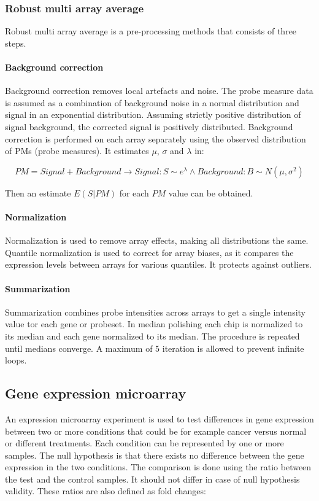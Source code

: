 		\subsubsection{Robust multi array average}
		Robust multi array average is a pre-processing methods that consists of three steps.

			\paragraph{Background correction}
			Background correction removes local artefacts and noise.
			The probe measure data is assumed as a combination of background noise in a normal distribution and signal in an exponential distribution.
			Assuming strictly positive distribution of signal background, the corrected signal is positively distributed.
			Background correction is performed on each array separately using the observed distribution of PMs (probe measures).
			It estimates $\mu$, $\sigma$ and $\lambda$ in:

			$$PM = Signal + Background \rightarrow Signal: S \sim e^\lambda \land Background : B\sim N(\mu, \sigma^2)$$

			Then an estimate $E(S|PM)$ for each $PM$ value can be obtained.

			\paragraph{Normalization}
			Normalization is used to remove array effects, making all distributions the same.
			Quantile normalization is used to correct for array biases, as it compares the expression levels between arrays for various quantiles.
			It protects against outliers.

			\paragraph{Summarization}
			Summarization combines probe intensities across arrays to get a single intensity value tor each gene or probeset.
			In median polishing each chip is normalized to its median and each gene normalized to its median.
			The procedure is repeated until medians converge.
			A maximum of $5$ iteration is allowed to prevent infinite loops.

	\subsection{Gene expression microarray}
	An expression microarray experiment is used to test differences in gene expression between two or more conditions that could be for example cancer versus normal or different treatments.
	Each condition can be represented by one or more samples.
	The null hypothesis is that there exists no difference between the gene expression in the two conditions.
	The comparison is done using the ratio between the test and the control samples.
	It should not differ in case of null hypothesis validity.
	These ratios are also defined as fold changes:

